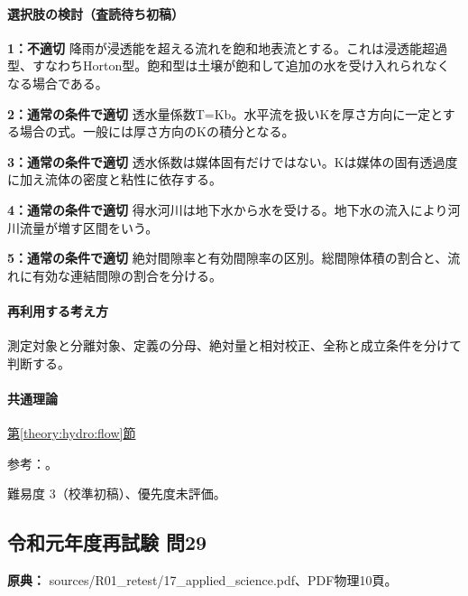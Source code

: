 \paragraph{選択肢の検討（査読待ち初稿）}\mbox{}\par

\noindent\textbf{1：不適切} 降雨が浸透能を超える流れを飽和地表流とする。これは浸透能超過型、すなわちHorton型。飽和型は土壌が飽和して追加の水を受け入れられなくなる場合である。\par

\noindent\textbf{2：通常の条件で適切} 透水量係数T=\allowbreak{}Kb。水平流を扱いKを厚さ方向に一定とする場合の式。一般には厚さ方向のKの積分となる。\par

\noindent\textbf{3：通常の条件で適切} 透水係数は媒体固有だけではない。Kは媒体の固有透過度に加え流体の密度と粘性に依存する。\par

\noindent\textbf{4：通常の条件で適切} 得水河川は地下水から水を受ける。地下水の流入により河川流量が増す区間をいう。\par

\noindent\textbf{5：通常の条件で適切} 絶対間隙率と有効間隙率の区別。総間隙体積の割合と、流れに有効な連結間隙の割合を分ける。\par

\paragraph{再利用する考え方} 測定対象と分離対象、定義の分母、絶対量と相対校正、全称と成立条件を分けて判断する。

\paragraph{共通理論} \hyperref[theory:hydro:flow]{第\ref*{theory:hydro:flow}節}

\par 参考：\cite{analysis49_runoff_ref,analysis49_darcy_ref}。

\par 難易度 3（校準初稿）、優先度未評価。

\subsection{令和元年度再試験 問29}
\label{q:r01-ret-applied-29}

\noindent\textbf{原典：} sources/R01\_retest/17\_applied\_science.pdf、PDF物理10頁。

